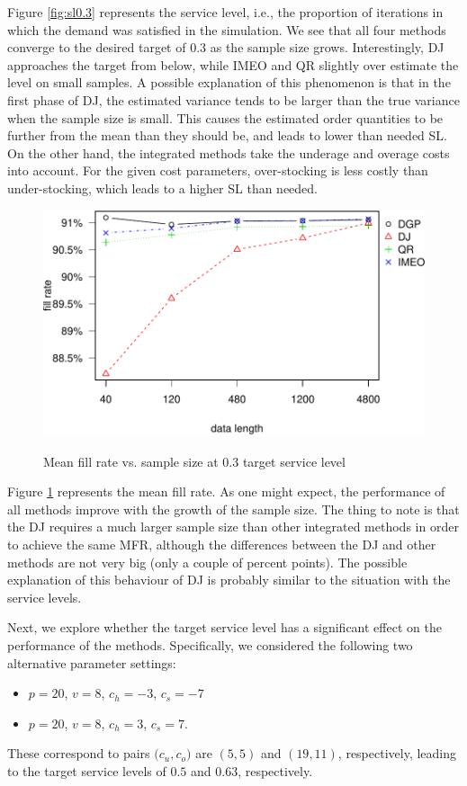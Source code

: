\documentclass[a4paper,11pt]{article}
\begin{document}
Figure \ref{fig:sl0.3} represents the service level, i.e., the proportion of iterations in which the demand was satisfied in the simulation. We see that all four methods converge to the desired target of 0.3 as the sample size grows. Interestingly, DJ approaches the target from below, while IMEO and QR slightly over estimate the level on small samples. A possible explanation of this phenomenon is that in the first phase of DJ, the estimated variance tends to be larger than the true variance when the sample size is small. This causes the estimated order quantities to be further from the mean than they should be, and leads to lower than needed SL. On the other hand, the integrated methods take the underage and overage costs into account. For the given cost parameters, over-stocking is less costly than under-stocking, which leads to a higher SL than needed.

\begin{figure}[ht]
\centering
\caption{Mean fill rate vs. sample size at 0.3 target service level}
\includegraphics{fr0.3.pdf}
\label{fig:fr0.3}
\end{figure}

Figure \ref{fig:fr0.3} represents the mean fill rate. As one might expect, the performance of all methods improve with the growth of the sample size. The thing to note is that the DJ requires a much larger sample size than other integrated methods in order to achieve the same MFR, although the differences between the DJ and other methods are not very big (only a couple of percent points). The possible explanation of this behaviour of DJ is probably similar to the situation with the service levels.

Next, we explore whether the target service level has a significant effect on the performance of the methods. Specifically, we considered the following two alternative parameter settings:
\begin{itemize}
    \item $p=20$, $v=8$, $c_h=-3$, $c_s=-7$
    \item $p=20$, $v=8$, $c_h=3$, $c_s=7$.
\end{itemize}
These correspond to pairs $\big( c_u,c_o \big)$ are $(5,5)$ and $(19,11)$, respectively, leading to the target service levels of $0.5$ and $0.63$, respectively.
\end{document}
